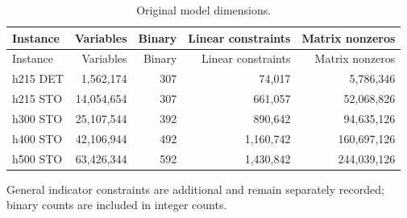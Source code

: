 \documentclass[
  english,
  11pt,
  a4paper,
  authoryear,
  preprint]{elsarticle}
\begin{document}
\begin{longtable}[]{@{}lrrrr@{}}
\caption{Original model
dimensions.}\label{tbl-scalar-size}\tabularnewline
\toprule\noalign{}
Instance & Variables & Binary & Linear constraints & Matrix nonzeros \\
\midrule\noalign{}
\endfirsthead
\toprule\noalign{}
Instance & Variables & Binary & Linear constraints & Matrix nonzeros \\
\midrule\noalign{}
\endhead
\bottomrule\noalign{}
\endlastfoot
h215 DET & 1,562,174 & 307 & 74,017 & 5,786,346 \\
h215 STO & 14,054,654 & 307 & 661,057 & 52,068,826 \\
h300 STO & 25,107,544 & 392 & 890,642 & 94,635,126 \\
h400 STO & 42,106,944 & 492 & 1,160,742 & 160,697,126 \\
h500 STO & 63,426,344 & 592 & 1,430,842 & 244,039,126 \\
\end{longtable}

General indicator constraints are additional and remain separately
recorded; binary counts are included in integer counts.
\end{document}
